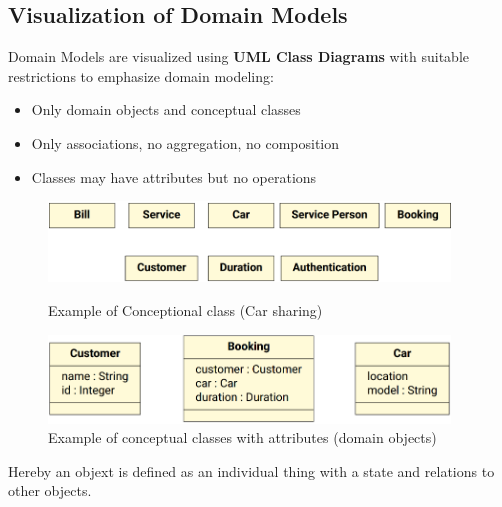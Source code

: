 \documentclass[
../../Software_Engineering_Summary.tex,
]
{subfiles}
\begin{document}
\subsection{Visualization of Domain Models}
Domain Models are visualized using \textbf{UML Class Diagrams} with suitable restrictions to emphasize domain modeling:
\begin{itemize}
    \item Only domain objects and conceptual classes
    \item Only associations, no aggregation, no composition
    \item Classes may have attributes but no operations
\end{itemize}

\begin{figure}
    [htp]
    \begin{minipage}
        [t]{0.5\textwidth}
        \centering
        \includegraphics[width=0.95\textwidth]{Pics/04/FirstClassModel.png}
        \caption{Example of Conceptional class (Car sharing)}
    \end{minipage}
    \hfill
    \begin{minipage}
        [t]{0.5\textwidth}
        \centering
        \includegraphics[width=0.95\textwidth]{Pics/04/ConceptualClass.png}
        \caption{Example of conceptual classes with attributes (domain objects)}
    \end{minipage}
\end{figure}

Hereby an objext is defined as an individual thing with a state and relations to other objects.
\end{document}
